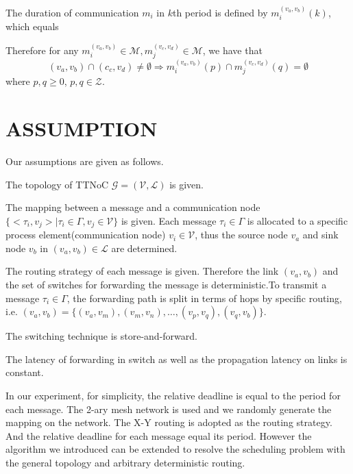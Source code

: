 \documentclass[conference]{IEEEtran}
\begin{document}
The duration of communication $m_{i}$ in $\mathit{k}$th period is defined by ${m_{i}^{(v_{a},v_{b})}}(k)$, which equals
\begin{equation}
	[
	k\times{m_{i}^{(v_{a},v_{b})}}.\mathcal{T}
	,
	k\times{m_{i}^{(v_{a},v_{b})}}.\mathcal{T}+{m_{i}^{(v_{a},v_{b})}}.\phi+{m_{i}^{(v_{a},v_{b})}}.\mathcal{L}			
	]
\end{equation}

Therefore for any $ {m_{i}^{(v_{a},v_{b})}}\in\mathcal{M}, {m_{j}^{(v_{c},v_{d})}}\in\mathcal{M}$, we have that
\begin{equation}
	(v_{a},v_{b})
	\cap
	(c_{c},v_{d})
	\neq
	\emptyset
	\Longrightarrow
	{m_{i}^{(v_{a},v_{b})}}(p)
	\cap
	{m_{j}^{(v_{c},v_{d})}}(q)
	=
	\emptyset	
\end{equation}
where $p,q\geq 0$, $p,q\in\mathcal{Z}$.

\section{ASSUMPTION}

Our assumptions are given as follows. 

The topology of TTNoC $\mathcal{G}=(\mathcal{V},\mathcal{L})$ is given.

The mapping between a message and a communication node $\{ <\tau_{i} , v_{j}>\mid \tau_{i}\in\Gamma,v_{j}\in\mathcal{V} \}$ is given. Each message $\tau_{i}\in\Gamma$ is allocated to a specific process element(communication node) $v_{i}\in\mathcal{V}$, thus the source node $v_{a}$ and sink node $v_{b}$ in $(v_{a},v_{b})\in \mathcal{L}$ are determined.

The routing strategy of each message is given. Therefore the link $(v_{a},v_{b})$ and the set of switches for forwarding the message is deterministic.To transmit a message $ \tau_{i}\in\Gamma $, the forwarding path is split in terms of hops by specific routing, i.e. $(v_{a},v_{b})=\{(v_{a},v_{m}),(v_{m},v_{n}),\dots,(v_{p},v_{q}),(v_{q},v_{b})\}$. 

The switching technique is store-and-forward.

The latency of forwarding in switch as well as the propagation latency on links is constant.

In our experiment, for simplicity, the relative deadline is equal to the period for each message. The 2-ary mesh network is used and we randomly generate the mapping on the network. The X-Y routing is adopted as the routing strategy. And the relative deadline for each message equal its period. However the algorithm we introduced can be extended to resolve the scheduling problem with the general topology and arbitrary deterministic routing.
\end{document}
